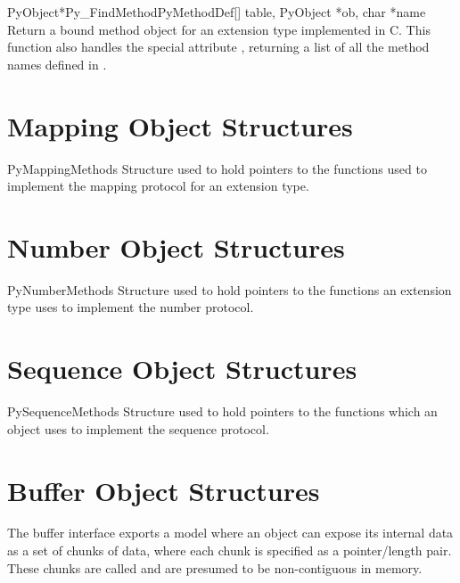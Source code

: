 \documentclass{manual}
\begin{document}
\begin{cfuncdesc}{PyObject*}{Py_FindMethod}{PyMethodDef[] table,
                                            PyObject *ob, char *name}
Return a bound method object for an extension type implemented in C.
This function also handles the special attribute ,
returning a list of all the method names defined in .
\end{cfuncdesc}


\section{Mapping Object Structures \label{mapping-structs}}

\begin{ctypedesc}{PyMappingMethods}
Structure used to hold pointers to the functions used to implement the 
mapping protocol for an extension type.
\end{ctypedesc}


\section{Number Object Structures \label{number-structs}}

\begin{ctypedesc}{PyNumberMethods}
Structure used to hold pointers to the functions an extension type
uses to implement the number protocol.
\end{ctypedesc}


\section{Sequence Object Structures \label{sequence-structs}}

\begin{ctypedesc}{PySequenceMethods}
Structure used to hold pointers to the functions which an object uses
to implement the sequence protocol.
\end{ctypedesc}


\section{Buffer Object Structures \label{buffer-structs}}

The buffer interface exports a model where an object can expose its
internal data as a set of chunks of data, where each chunk is
specified as a pointer/length pair.  These chunks are called
 and are presumed to be non-contiguous in memory.
\end{document}
